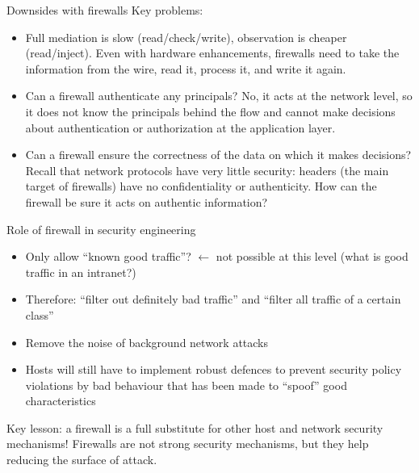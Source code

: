 \begin{parag}{Downsides with firewalls}
    Key problems:
	\begin{itemize}
	    \item Full mediation is slow (read/check/write), observation is cheaper (read/inject). Even with hardware enhancements, firewalls need to take the information from the wire, read it, process it, and write it again.
	    \item Can a firewall authenticate any principals? No, it acts at the network level, so it does not know the principals behind the flow and cannot make decisions about authentication or authorization at the application layer.
	    \item Can a firewall ensure the correctness of the data on which it makes decisions? Recall that network protocols have very little security: headers (the main target of firewalls) have no confidentiality or authenticity. How can the firewall be sure it acts on authentic information?
	\end{itemize}
	\begin{subparag}{Role of firewall in security engineering}
		\begin{itemize}
		    \item Only allow ``known good traffic''? $\leftarrow$ not possible at this level (what is good traffic in an intranet?)
		    \item Therefore: ``filter out definitely bad traffic'' and ``filter all traffic of a certain class''
		    \item Remove the noise of background network attacks
		    \item Hosts will still have to implement robust defences to prevent security policy violations by bad behaviour that has been made to ``spoof'' good characteristics
		\end{itemize}
	\end{subparag}
\end{parag}
\begin{framedremark}
Key lesson: a firewall is  a full substitute for other host and network security mechanisms! Firewalls are not strong security mechanisms, but they help reducing the surface of attack.
\end{framedremark}

